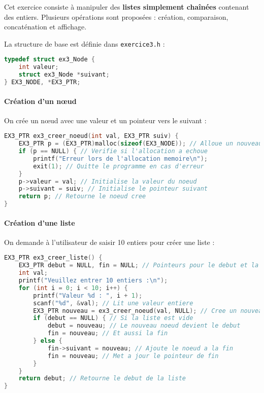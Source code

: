 \documentclass[a4paper,12pt]{article}
\begin{document}
Cet exercice consiste à manipuler des \textbf{listes simplement chaînées} contenant des entiers. Plusieurs opérations sont proposées : création, comparaison, concaténation et affichage.

La structure de base est définie dans \texttt{exercice3.h} :

\begin{lstlisting}[language=C, caption={Structure d'un nœud}]
typedef struct ex3_Node {
    int valeur;
    struct ex3_Node *suivant;
} EX3_NODE, *EX3_PTR;
\end{lstlisting}

\paragraph{Création d'un nœud}  
On crée un nœud avec une valeur et un pointeur vers le suivant :

\begin{lstlisting}[language=C, caption={Création d'un nœud}]
EX3_PTR ex3_creer_noeud(int val, EX3_PTR suiv) {
    EX3_PTR p = (EX3_PTR)malloc(sizeof(EX3_NODE)); // Alloue un nouveau noeud
    if (p == NULL) { // Verifie si l'allocation a echoue
        printf("Erreur lors de l'allocation memoire\n");
        exit(1); // Quitte le programme en cas d'erreur
    }
    p->valeur = val; // Initialise la valeur du noeud
    p->suivant = suiv; // Initialise le pointeur suivant
    return p; // Retourne le noeud cree
}

\end{lstlisting}

\paragraph{Création d'une liste}  
On demande à l'utilisateur de saisir 10 entiers pour créer une liste :

\begin{lstlisting}[language=C, caption={Création d'une liste avec saisie}]
EX3_PTR ex3_creer_liste() {
    EX3_PTR debut = NULL, fin = NULL; // Pointeurs pour le debut et la fin de la liste
    int val;
    printf("Veuillez entrer 10 entiers :\n");
    for (int i = 0; i < 10; i++) {
        printf("Valeur %d : ", i + 1);
        scanf("%d", &val); // Lit une valeur entiere
        EX3_PTR nouveau = ex3_creer_noeud(val, NULL); // Cree un nouveau noeud
        if (debut == NULL) { // Si la liste est vide
            debut = nouveau; // Le nouveau noeud devient le debut
            fin = nouveau; // Et aussi la fin
        } else {
            fin->suivant = nouveau; // Ajoute le noeud a la fin
            fin = nouveau; // Met a jour le pointeur de fin
        }
    }
    return debut; // Retourne le debut de la liste
}
\end{lstlisting}
\end{document}
